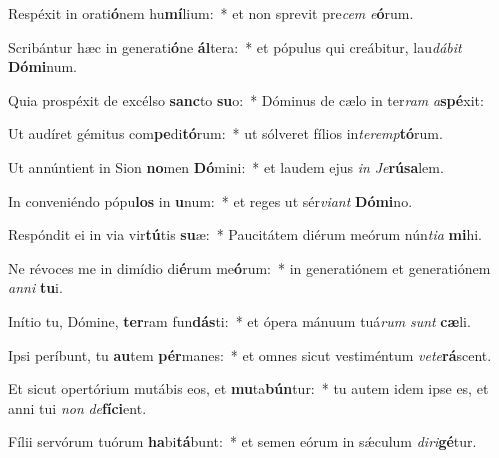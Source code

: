 \item Respéxit in orati\textbf{ó}nem hu\textbf{mí}lium:~* et non sprevit pre\textit{cem} \textit{e}\textbf{ó}rum.
\item Scribántur hæc in generati\textbf{ó}ne \textbf{ál}tera:~* et pópulus qui creábitur, lau\textit{dá}\textit{bit} \textbf{Dó}\textbf{mi}num.
\item Quia prospéxit de excélso \textbf{sanc}to \textbf{su}o:~* Dóminus de cælo in ter\textit{ram} \textit{a}\textbf{spé}xit:
\item Ut audíret gémitus com\textbf{pe}di\textbf{tó}rum:~* ut sólveret fílios in\textit{ter}\textit{emp}\textbf{tó}rum.
\item Ut annúntient in Sion \textbf{no}men \textbf{Dó}mini:~* et laudem ejus \textit{in} \textit{Je}\textbf{rú}\textbf{sa}lem.
\item In conveniéndo pópu\textbf{los} in \textbf{u}num:~* et reges ut sér\textit{vi}\textit{ant} \textbf{Dó}\textbf{mi}no.
\item Respóndit ei in via vir\textbf{tú}tis \textbf{su}æ:~* Paucitátem diérum meórum nún\textit{ti}\textit{a} \textbf{mi}hi.
\item Ne révoces me in dimídio di\textbf{é}rum me\textbf{ó}rum:~* in generatiónem et generatiónem \textit{an}\textit{ni} \textbf{tu}i.
\item Inítio tu, Dómine, \textbf{ter}ram fun\textbf{dás}ti:~* et ópera mánuum tuá\textit{rum} \textit{sunt} \textbf{cæ}li.
\item Ipsi períbunt, tu \textbf{au}tem \textbf{pér}manes:~* et omnes sicut vestiméntum \textit{ve}\textit{te}\textbf{rá}scent.
\item Et sicut opertórium mutábis eos, et \textbf{mu}ta\textbf{bún}tur:~* tu autem idem ipse es, et anni tui \textit{non} \textit{de}\textbf{fí}\textbf{ci}ent.
\item Fílii servórum tuórum \textbf{ha}bi\textbf{tá}bunt:~* et semen eórum in sǽculum \textit{di}\textit{ri}\textbf{gé}tur.
